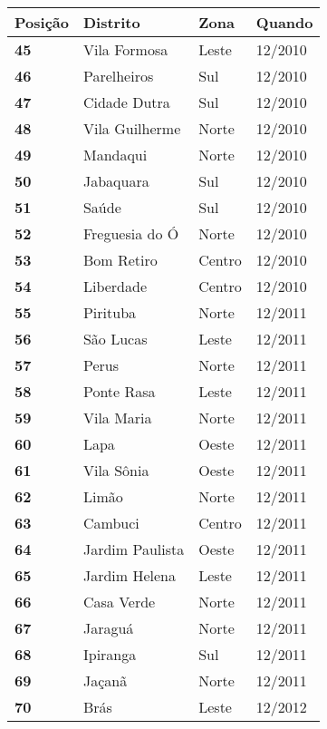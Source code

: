 \begin{table}[H]
	\centering
	\begin{tabular}{l|l|l|l}
		\textbf{Posição} & \textbf{Distrito} & \textbf{Zona} & \textbf{Quando} \\ \hline
		\textbf{45} & Vila Formosa & Leste & 12/2010\\ \hline
		\textbf{46} & Parelheiros & Sul & 12/2010\\ \hline
		\textbf{47} & Cidade Dutra & Sul & 12/2010\\ \hline
		\textbf{48} & Vila Guilherme & Norte & 12/2010\\ \hline
		\textbf{49} & Mandaqui & Norte & 12/2010\\ \hline
		\textbf{50} & Jabaquara & Sul & 12/2010\\ \hline
		\textbf{51} & Saúde & Sul & 12/2010\\ \hline
		\textbf{52} & Freguesia do Ó & Norte & 12/2010\\ \hline
		\textbf{53} & Bom Retiro & Centro & 12/2010\\ \hline
		\textbf{54} & Liberdade & Centro & 12/2010\\ \hline
		\textbf{55} & Pirituba & Norte & 12/2011\\ \hline
		\textbf{56} & São Lucas & Leste & 12/2011\\ \hline
		\textbf{57} & Perus & Norte & 12/2011\\ \hline
		\textbf{58} & Ponte Rasa & Leste & 12/2011\\ \hline
		\textbf{59} & Vila Maria & Norte & 12/2011\\ \hline
		\textbf{60} & Lapa & Oeste & 12/2011\\ \hline
		\textbf{61} & Vila Sônia & Oeste & 12/2011\\ \hline
		\textbf{62} & Limão & Norte & 12/2011\\ \hline
		\textbf{63} & Cambuci & Centro & 12/2011\\ \hline
		\textbf{64} & Jardim Paulista & Oeste & 12/2011\\ \hline
		\textbf{65} & Jardim Helena & Leste & 12/2011\\ \hline
		\textbf{66} & Casa Verde & Norte & 12/2011\\ \hline
		\textbf{67} & Jaraguá & Norte & 12/2011\\ \hline
		\textbf{68} & Ipiranga & Sul & 12/2011\\ \hline
		\textbf{69} & Jaçanã & Norte & 12/2011\\ \hline
		\textbf{70} & Brás & Leste & 12/2012\\ \hline

\end{tabular}
\end{table}
